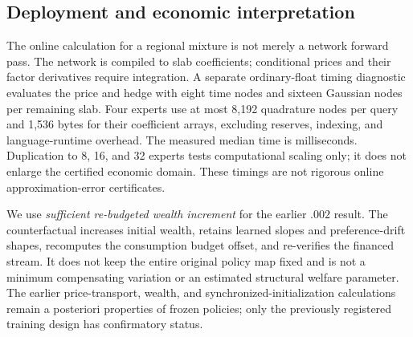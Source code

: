 \subsection{Deployment and economic interpretation}
The online calculation for a regional mixture is not merely a network forward pass. The network is compiled to slab coefficients; conditional prices and their factor derivatives require integration. A separate ordinary-float timing diagnostic evaluates the price and hedge with eight time nodes and sixteen Gaussian nodes per remaining slab. Four experts use at most 8,192 quadrature nodes per query and 1,536 bytes for their coefficient arrays, excluding reserves, indexing, and language-runtime overhead. The measured median time is \RXXIIRuntimeMs{} milliseconds. Duplication to 8, 16, and 32 experts tests computational scaling only; it does not enlarge the certified economic domain. These timings are not rigorous online approximation-error certificates.

We use \emph{sufficient re-budgeted wealth increment} for the earlier $.002$ result. The counterfactual increases initial wealth, retains learned slopes and preference-drift shapes, recomputes the consumption budget offset, and re-verifies the financed stream. It does not keep the entire original policy map fixed and is not a minimum compensating variation or an estimated structural welfare parameter. The earlier price-transport, wealth, and synchronized-initialization calculations remain a posteriori properties of frozen policies; only the previously registered training design has confirmatory status.
